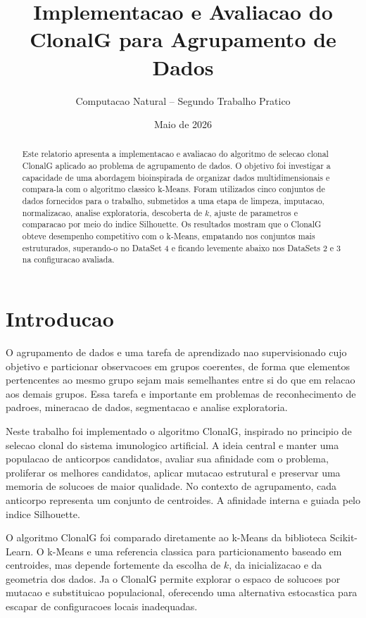 \documentclass[12pt,a4paper]{article}
\title{Implementacao e Avaliacao do ClonalG para Agrupamento de Dados}
\author{Computacao Natural -- Segundo Trabalho Pratico}
\date{Maio de 2026}
\begin{document}
\maketitle

\begin{abstract}
Este relatorio apresenta a implementacao e avaliacao do algoritmo de selecao clonal ClonalG aplicado ao problema de agrupamento de dados. O objetivo foi investigar a capacidade de uma abordagem bioinspirada de organizar dados multidimensionais e compara-la com o algoritmo classico k-Means. Foram utilizados cinco conjuntos de dados fornecidos para o trabalho, submetidos a uma etapa de limpeza, imputacao, normalizacao, analise exploratoria, descoberta de \(k\), ajuste de parametros e comparacao por meio do indice Silhouette. Os resultados mostram que o ClonalG obteve desempenho competitivo com o k-Means, empatando nos conjuntos mais estruturados, superando-o no DataSet 4 e ficando levemente abaixo nos DataSets 2 e 3 na configuracao avaliada.
\end{abstract}

\tableofcontents
\newpage

\section{Introducao}
O agrupamento de dados e uma tarefa de aprendizado nao supervisionado cujo objetivo e particionar observacoes em grupos coerentes, de forma que elementos pertencentes ao mesmo grupo sejam mais semelhantes entre si do que em relacao aos demais grupos. Essa tarefa e importante em problemas de reconhecimento de padroes, mineracao de dados, segmentacao e analise exploratoria.

Neste trabalho foi implementado o algoritmo ClonalG, inspirado no principio de selecao clonal do sistema imunologico artificial. A ideia central e manter uma populacao de anticorpos candidatos, avaliar sua afinidade com o problema, proliferar os melhores candidatos, aplicar mutacao estrutural e preservar uma memoria de solucoes de maior qualidade. No contexto de agrupamento, cada anticorpo representa um conjunto de centroides. A afinidade interna e guiada pelo indice Silhouette.

O algoritmo ClonalG foi comparado diretamente ao k-Means da biblioteca Scikit-Learn. O k-Means e uma referencia classica para particionamento baseado em centroides, mas depende fortemente da escolha de \(k\), da inicializacao e da geometria dos dados. Ja o ClonalG permite explorar o espaco de solucoes por mutacao e substituicao populacional, oferecendo uma alternativa estocastica para escapar de configuracoes locais inadequadas.
\end{document}

